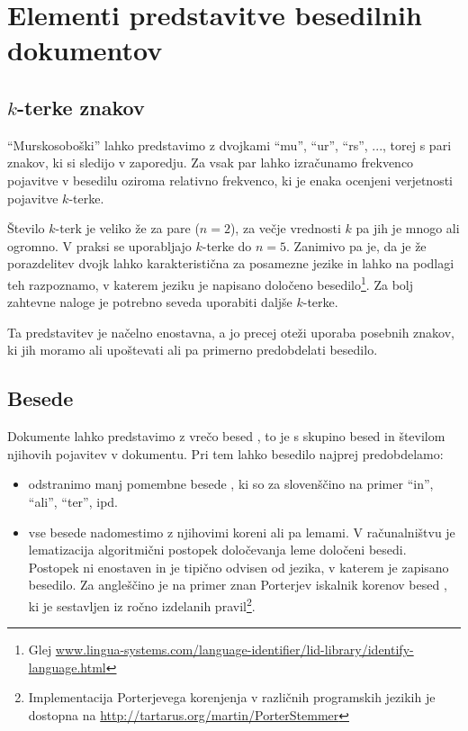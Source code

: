 \section{Elementi predstavitve besedilnih dokumentov}

\subsection{$k$-terke znakov}

``Murskosoboški'' lahko predstavimo z dvojkami ``mu'', ``ur'', ``rs'',
..., torej s pari znakov, ki si sledijo v zaporedju. Za vsak par lahko
izračunamo frekvenco pojavitve v besedilu oziroma relativno frekvenco,
ki je enaka ocenjeni verjetnosti pojavitve $k$-terke. 

Število $k$-terk je veliko že za pare ($n=2$), za večje vrednosti $k$
pa jih je mnogo ali ogromno. V praksi se uporabljajo $k$-terke do
$n=5$. Zanimivo pa je, da je že porazdelitev dvojk lahko
karakteristična za posamezne jezike in lahko na podlagi teh
razpoznamo, v katerem jeziku je napisano določeno
besedilo\footnote{Glej
  \url{www.lingua-systems.com/language-identifier/lid-library/identify-language.html}}. Za
bolj zahtevne naloge je potrebno seveda uporabiti daljše $k$-terke.

Ta predstavitev je načelno enostavna, a jo precej oteži uporaba
posebnih znakov, ki jih moramo ali upoštevati ali pa primerno
predobdelati besedilo.

\subsection{Besede}

Dokumente lahko predstavimo z vrečo besed , to je s
skupino besed in številom njihovih pojavitev v dokumentu. Pri tem
lahko besedilo najprej predobdelamo:
\begin{itemize}
\item odstranimo manj pomembne besede , ki so za
  slovenščino na primer ``in'', ``ali'', ``ter'', ipd.
\item vse besede nadomestimo z njihovimi koreni ali pa lemami. V
  računalništvu je lematizacija algoritmični postopek določevanja leme
  določeni besedi. Postopek ni enostaven in je tipično odvisen od
  jezika, v katerem je zapisano besedilo. Za angleščino je na primer
  znan Porterjev iskalnik korenov besed , ki je
  sestavljen iz ročno izdelanih pravil\footnote{Implementacija
    Porterjevega korenjenja v različnih programskih jezikih je
    dostopna na \url{http://tartarus.org/martin/PorterStemmer}}.
\end{itemize}


